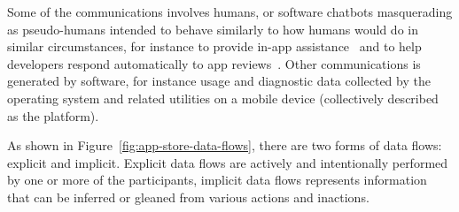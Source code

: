 Some of the communications involves humans, or software chatbots masquerading as pseudo-humans intended to behave similarly to how humans would do in similar circumstances, for instance to provide in-app assistance~ and to help developers respond automatically to app reviews~. Other communications is generated by software, for instance usage and diagnostic data collected by the operating system and related utilities on a mobile device (collectively described as the platform).

As shown in Figure~\ref{fig:app-store-data-flows}, there are two forms of data flows: explicit and implicit. Explicit data flows are actively and intentionally performed by one or more of the participants, implicit data flows represents information that can be inferred or gleaned from various actions and inactions.

